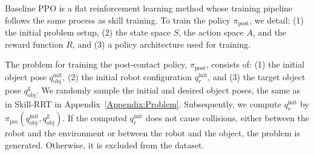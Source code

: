 
Baseline PPO is a flat reinforcement learning method whose training pipeline follows the same process as skill training. To train the policy \( \pi_\text{post} \), we detail: (1) the initial problem setup, (2) the state space \( S \), the action space \( A \), and the reward function \( R \), and (3) a policy architecture used for training.

The problem for training the post-contact policy, \(\pi_\text{post} \), consists of: (1) the initial object pose \( q^\text{init}_\text{obj} \), (2) the initial robot configuration \( q^\text{init}_r \), and (3) the target object pose \( q^\text{g}_\text{obj} \). We randomly sample the initial and desired object poses, the same as in Skill-RRT in Appendix~\ref{Appendix:Problem}.
Subsequently, we compute \( q^\text{init}_r \) by \( \pi_\text{pre}(q^\text{init}_\text{obj},q^\text{g}_\text{obj}) \). If the computed \( q^\text{init}_r \) does not cause collisions, either between the robot and the environment or between the robot and the object, the problem is generated. Otherwise, it is excluded from the dataset.


